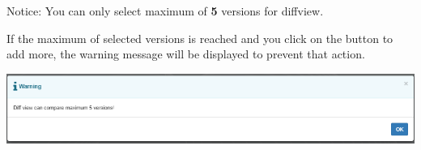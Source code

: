 \begin{boxhint}{Notice:}
   You can only select maximum of \textbf{5} versions for diffview.

   If the maximum of selected versions is reached and you click on the button to 
   add more, the warning message will be displayed to prevent that action.
\end{boxhint}

\includegraphics[width=1\linewidth]{./pictures/diffview/warning.png}